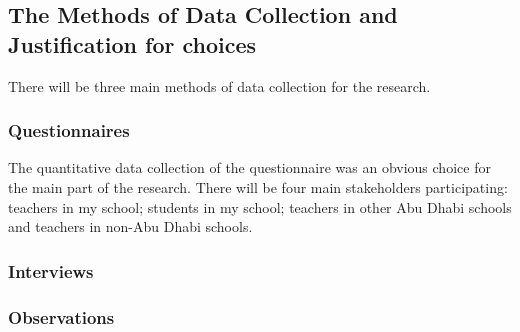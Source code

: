 \subsection{The Methods of Data Collection and Justification for choices}
There will be three main methods of data collection for the research.

\subsubsection{Questionnaires}
The quantitative data collection of the questionnaire was an obvious choice for the main part of the research. There will be four main stakeholders participating: teachers in my school; students in my school; teachers in other Abu Dhabi schools and teachers in non-Abu Dhabi schools. 



\subsubsection{Interviews}

\subsubsection{Observations}